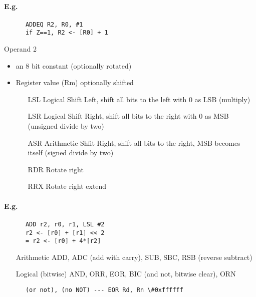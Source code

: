     \paragraph{E.g.}
    \begin{lstlisting}
      ADDEQ R2, R0, #1
      if Z==1, R2 <- [R0] + 1
    \end{lstlisting}

    Operand 2
    \begin{itemize}
      \item an 8 bit constant (optionally rotated)
      \item Register value (Rm) optionally shifted
      \begin{itemize}
        \item[LSL] Logical Shift Left, shift all bits to the left with 0 as LSB
          (multiply)
        \item[LSR] Logical Shift Right, shift all bits to the right with 0 as
          MSB (unsigned divide by two)
        \item[ASR] Arithmetic Shfit Right, shift all bits to the right, MSB
          becomes itself (signed divide by two)
        \item[RDR] Rotate right
        \item[RRX] Rotate right extend
      \end{itemize}
    \end{itemize}
    \paragraph{E.g.}
    \begin{lstlisting}
      ADD r2, r0, r1, LSL #2
      r2 <- [r0] + [r1] << 2
      = r2 <- [r0] + 4*[r2]
    \end{lstlisting}

    \begin{itemize}
      \item[Arithmetic] ADD, ADC (add with carry), SUB, SBC, RSB (reverse
      subtract)
      \item[Logical] (bitwise) AND, ORR, EOR, BIC (and not, bitwise clear), ORN
    \end{itemize}
    \begin{lstlisting}
      (or not), (no NOT) --- EOR Rd, Rn \#0xffffff
    \end{lstlisting}

